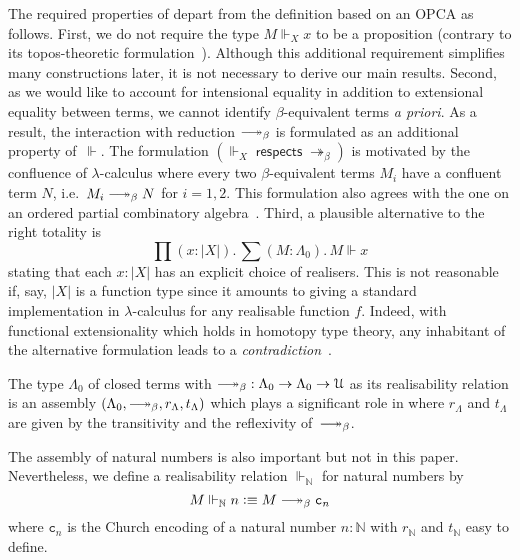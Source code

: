 \documentclass[a4paper,UKenglish,numberwithinsect,cleveref,thm-restate]{lipics-v2021}
\newcommand{\Nat}{\mathbb{N}}
\newcommand{\defeq}{\vcentcolon\equiv}
\newcommand{\Univ}{\mathcal{U}}
\DeclareRobustCommand\longtwoheadrightarrow{\relbar\joinrel\twoheadrightarrow}
\newcommand{\reduce}{\longtwoheadrightarrow_{\beta}}
\theoremstyle{plain}
\begin{document}
The required properties of  depart from the definition based on an OPCA as follows. 
First, we do not require the type $M \Vdash_X x$ to be a proposition (contrary to its topos-theoretic formulation~\cite{Birkedal2002a}).
Although this additional requirement simplifies many constructions later, it is not necessary to derive our main results.
Second, as we would like to account for intensional equality in addition to extensional equality between terms,
we cannot identify $\beta$-equivalent terms \emph{a priori}.
As a result, the interaction with reduction $\reduce$ is formulated as an additional property of~$\Vdash$. 
The formulation $\left(\mathord{\Vdash_X}\;\mathsf{respects}\;\mathord{\twoheadrightarrow_\beta}\right)$ is motivated by the confluence of $\lambda$-calculus where every two $\beta$-equivalent terms $M_i$ have a confluent term $N$, i.e.\ $M_i \reduce N$ for $i = 1, 2$.
This formulation also agrees with the one on an ordered partial combinatory algebra~\cite[Section~2.3]{Hofstra2003}.
Third, a plausible alternative to the right totality is
\[
  \prod (x : |X|).\, \sum (M : \Lambda_0).\, M \Vdash x
\]
stating that each $x : |X|$ has an explicit choice of realisers.
This is not reasonable if, say, $|X|$ is a function type since it amounts to giving a standard implementation in $\lambda$-calculus for any realisable function $f$.
Indeed, with functional extensionality which holds in homotopy type theory, any inhabitant of the alternative formulation leads to a \emph{contradiction}~\cite{Troelstra1977}. 

\begin{example}\label{ex:assembly-lambda}
  The type $\Lambda_0$ of closed terms with ${\reduce} : \Lambda_0 \to \Lambda_0 \to \Univ$ as its realisability relation is an assembly $(\Lambda_0, \reduce, r_\Lambda, t_\Lambda)$ which plays a significant role in  where $r_\Lambda$ and $t_\Lambda$ are given by the transitivity and the reflexivity of~$\reduce$.
\end{example}

\begin{example}
  The assembly of natural numbers is also important but not in this paper.
  Nevertheless, we define a realisability relation $\Vdash_{\Nat}$ for natural numbers by
  \[
    M \Vdash_\Nat n \defeq M \reduce \mathtt{c}_n
  \]
  where $\mathtt{c}_n$ is the Church encoding of a natural number $n : \Nat$ with $r_\Nat$ and $t_\Nat$ easy to define. 
\end{example}
\end{document}
